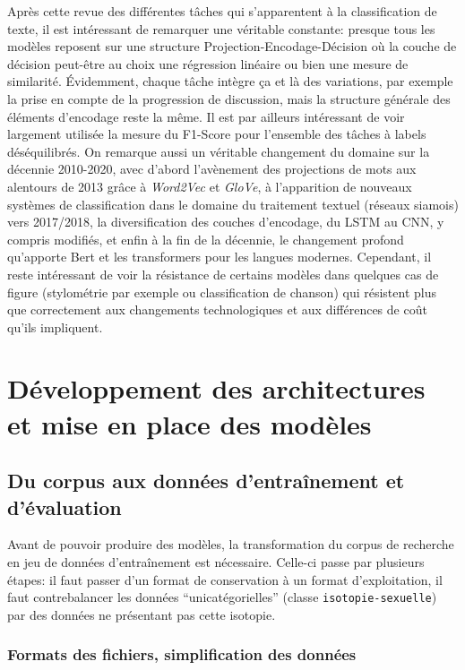 Après cette revue des différentes tâches qui s'apparentent à la classification de texte, il est intéressant de remarquer une véritable constante: presque tous les modèles reposent sur une structure Projection-Encodage-Décision où la couche de décision peut-être au choix une régression linéaire ou bien une mesure de similarité. Évidemment, chaque tâche intègre ça et là des variations, par exemple la prise en compte de la progression de discussion, mais la structure générale des éléments d'encodage reste la même. Il est par ailleurs intéressant de voir largement utilisée la mesure du F1-Score pour l'ensemble des tâches à labels déséquilibrés. On remarque aussi un véritable changement du domaine sur la décennie 2010-2020, avec  d'abord l'avènement des projections de mots aux alentours de 2013 grâce à \textit{Word2Vec} et \textit{GloVe}, à l'apparition de nouveaux systèmes de classification dans le domaine du traitement textuel (réseaux siamois) vers 2017/2018, la diversification des couches d'encodage, du LSTM au CNN, y compris modifiés, et enfin à la fin de la décennie, le changement profond qu'apporte Bert et les transformers pour les langues modernes. Cependant, il reste intéressant de voir la résistance de certains modèles dans quelques cas de figure (stylométrie par exemple ou classification de chanson) qui résistent plus que correctement aux changements technologiques et aux différences de coût qu'ils impliquent.



\section{Développement des architectures et mise en place des modèles}

\subsection{Du corpus aux données d'entraînement et d'évaluation}

Avant de pouvoir produire des modèles, la transformation du corpus de recherche en jeu de données d'entraînement est nécessaire. Celle-ci passe par plusieurs étapes: il faut passer d'un format de conservation à un format d'exploitation, il faut contrebalancer les données \enquote{unicatégorielles} (classe \texttt{isotopie-sexuelle}) par des données ne présentant pas cette isotopie.


\subsubsection{Formats des fichiers, simplification des données}

